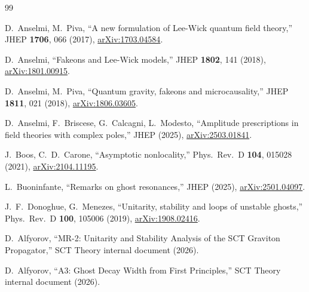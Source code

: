 \documentclass[11pt,a4paper]{article}
\begin{document}
\begin{thebibliography}{99}

D.~Anselmi, M.~Piva,
``A new formulation of Lee-Wick quantum field theory,''
JHEP \textbf{1706}, 066 (2017),
\href{https://arxiv.org/abs/1703.04584}{arXiv:1703.04584}.

D.~Anselmi,
``Fakeons and Lee-Wick models,''
JHEP \textbf{1802}, 141 (2018),
\href{https://arxiv.org/abs/1801.00915}{arXiv:1801.00915}.

D.~Anselmi, M.~Piva,
``Quantum gravity, fakeons and microcausality,''
JHEP \textbf{1811}, 021 (2018),
\href{https://arxiv.org/abs/1806.03605}{arXiv:1806.03605}.

D.~Anselmi, F.~Briscese, G.~Calcagni, L.~Modesto,
``Amplitude prescriptions in field theories with complex poles,''
JHEP (2025),
\href{https://arxiv.org/abs/2503.01841}{arXiv:2503.01841}.

J.~Boos, C.~D.~Carone,
``Asymptotic nonlocality,''
Phys.\ Rev.\ D \textbf{104}, 015028 (2021),
\href{https://arxiv.org/abs/2104.11195}{arXiv:2104.11195}.

L.~Buoninfante,
``Remarks on ghost resonances,''
JHEP (2025),
\href{https://arxiv.org/abs/2501.04097}{arXiv:2501.04097}.

J.~F.~Donoghue, G.~Menezes,
``Unitarity, stability and loops of unstable ghosts,''
Phys.\ Rev.\ D \textbf{100}, 105006 (2019),
\href{https://arxiv.org/abs/1908.02416}{arXiv:1908.02416}.

D.~Alfyorov,
``MR-2: Unitarity and Stability Analysis of the SCT Graviton Propagator,''
SCT Theory internal document (2026).

D.~Alfyorov,
``A3: Ghost Decay Width from First Principles,''
SCT Theory internal document (2026).

\end{thebibliography}
\end{document}
